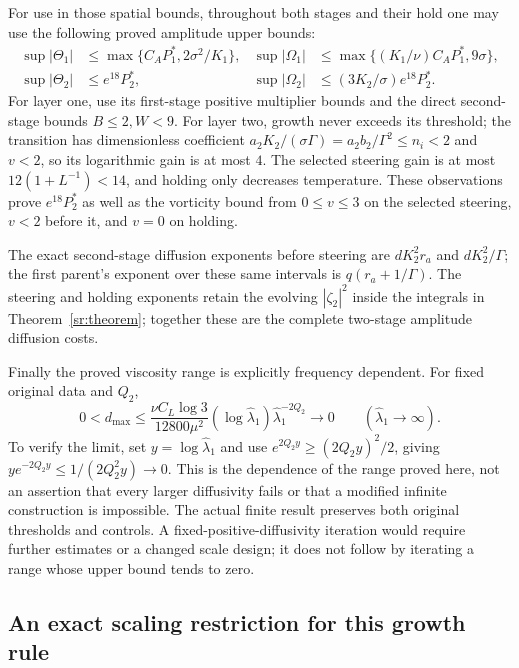For use in those spatial bounds, throughout both stages and their hold
one may use the following proved amplitude upper bounds:
\begin{align}
 \sup|\Theta_1|&\leq
       \max\{C_AP_1^*,2\sigma^2/K_1\},&
 \sup|\Omega_1|&\leq
       \max\{(K_1/\nu)C_AP_1^*,9\sigma\},\nonumber\\
 \sup|\Theta_2|&\leq e^{18}P_2^*,&
 \sup|\Omega_2|&\leq (3K_2/\sigma)e^{18}P_2^*.
 \label{ave:amplitude_sup}
\end{align}
For layer one, use its first-stage positive multiplier bounds and
the direct second-stage bounds $B\leq2,W<9$.
For layer two, growth never exceeds its threshold; the transition
has dimensionless coefficient $a_2K_2/(\sigma\Gamma)
=a_2b_2/\Gamma^2\leq n_i<2$ and $v<2$, so its logarithmic
gain is at most $4$. The selected steering gain is at most
$12(1+L^{-1})<14$, and holding only decreases temperature.
These observations prove $e^{18}P_2^*$ as well as the vorticity
bound from $0\leq v\leq3$ on the selected steering, $v<2$ before it,
and $v=0$ on holding.

The exact second-stage diffusion exponents before steering are
$dK_2^2r_a$ and $dK_2^2/\Gamma$; the first parent's exponent
over these same intervals is $q(r_a+1/\Gamma)$.
The steering and holding exponents retain the evolving $|\zeta_2|^2$
inside the integrals in Theorem~\ref{sr:theorem}; together these are
the complete two-stage amplitude diffusion costs.

Finally the proved viscosity range is explicitly frequency dependent.
For fixed original data and $Q_2$,
\begin{equation}\label{ave:range_limit}
 0<d_{\max}\leq
 \frac{\nu C_L\log3}{12800\mu^2}
 (\log\widehat\lambda_1)\widehat\lambda_1^{-2Q_2}
 \longrightarrow0\qquad(\widehat\lambda_1\longrightarrow\infty).
\end{equation}
To verify the limit, set $y=\log\widehat\lambda_1$ and use
$e^{2Q_2y}\geq(2Q_2y)^2/2$, giving
$ye^{-2Q_2y}\leq1/(2Q_2^2y)\to0$.
This is the dependence of the range proved here, not an assertion
that every larger diffusivity fails or that a modified infinite
construction is impossible. The actual finite result preserves both
original thresholds and controls. A fixed-positive-diffusivity
iteration would require further estimates or a changed scale design;
it does not follow by iterating a range whose upper bound tends to zero.

\subsection{An exact scaling restriction for this growth rule}

